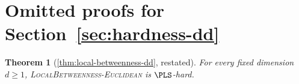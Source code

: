 \documentclass{article}
\theoremstyle{definition}  %
\theoremstyle{plain}
\newtheorem{theorem}{Theorem}
\numberwithin{observation}{section}
\numberwithin{claim}{section}
\numberwithin{fact}{section}
\numberwithin{lemma}{section}
\numberwithin{proposition}{section}
\numberwithin{theorem}{section}
\numberwithin{corollary}{section}
\numberwithin{definition}{section}
\theoremstyle{plain}
\begin{document}
\newpage

\appendix

% 
\section{Omitted proofs for Section~\ref{sec:hardness-dd}}\label{app:betweenness-high}

\begin{theorem}[\cref{thm:local-betweenness-dd}, restated]
For every fixed dimension $d\ge 1$, \textsc{LocalBetweenness-Euclidean} is $\PLS$-hard. 
\end{theorem}


\end{document}
